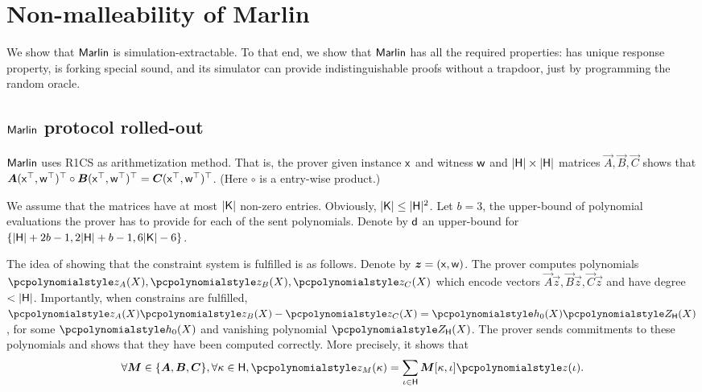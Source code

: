 
\section{Non-malleability of Marlin}
We show that ${\textnormal{\textsf{Marlin}}}$ is simulation-extractable. To that end, we show
that ${\textnormal{\textsf{Marlin}}}$ has all the required properties: has unique response property, is
forking special sound, and its simulator can provide indistinguishable proofs
without a trapdoor, just by programming the random oracle.

\subsection{${\textnormal{\textsf{Marlin}}}$ protocol rolled-out}
${\textnormal{\textsf{Marlin}}}$ uses R1CS as arithmetization method. That is, the prover given
instance $\mathsf{x}$ and witness $\mathsf{w}$ and $|\mathsf{H}| \times |\mathsf{H}|$ matrices $\vec{A},
\vec{B}, \vec{C}$ shows that $\vec{A} (\inp^\top, \wit^\top)^\top \circ \vec{B}
(\inp^\top, \wit^\top)^\top = \vec{C} (\inp^\top, \wit^\top)^\top$. (Here
$\circ$ is a entry-wise product.)

We assume that the matrices have at most $|\mathsf{K}|$ non-zero entries. Obviously,
$|\mathsf{K}| \leq |\mathsf{H}|^2$. Let $b = 3$, the upper-bound of polynomial evaluations
the prover has to provide for each of the sent polynomials.  Denote by $\mathsf{d}$
an upper-bound for $\{|\mathsf{H}| + 2b -1, 2 |\mathsf{H}| + b - 1, 6 |\mathsf{K}| - 6\}$.

The idea of showing that the constraint system is fulfilled is as
follows. Denote by $\vec{z} = (\inp, \wit)$. The prover computes polynomials
$\p{z_A} (X), \p{z_B} (X), \p{z_C} (X)$ which encode vectors
$\vec{A} \vec{z}, \vec{B} \vec{z}, \vec{C} \vec{z}$ and have degree $<
|\mathsf{H}|$. Importantly, when constrains are fulfilled,
$ \p{z_A} (X) \p{z_B} (X) - \p{z_C} (X) = \p{h_0} (X) \ZERO_\HHH (X)$, for some
$\p{h_0} (X)$ and vanishing polynomial $\ZERO_\HHH (X)$. The prover sends
commitments to these polynomials and shows that they have been computed
correctly. More precisely, it shows that
\begin{equation}
  \label{eq:marlin_eq_2}
\forall \vec{M} \in \smallset{\vec{A}, \vec{B}, \vec{C}},  \forall \kappa \in \HHH,
\p{z_M} (\kappa) = \sum_{\iota \in \HHH} \vec{M}[\kappa, \iota] \p{z}(\iota).
\end{equation}

